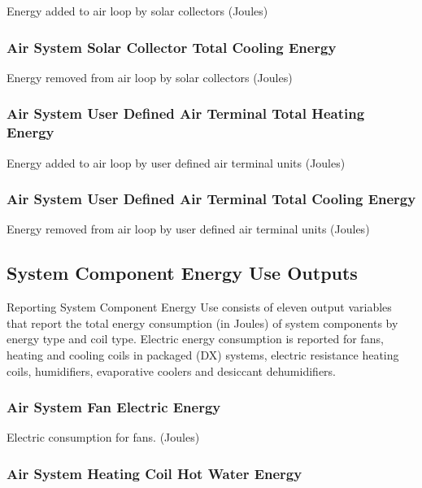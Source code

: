 Energy added to air loop by solar collectors (Joules)

\subsubsection{Air System Solar Collector Total Cooling Energy}\label{air-system-solar-collector-total-cooling-energy}

Energy removed from air loop by solar collectors (Joules)

\subsubsection{Air System User Defined Air Terminal Total Heating Energy}\label{air-system-user-defined-air-terminal-total-heating-energy}

Energy added to air loop by user defined air terminal units (Joules)

\subsubsection{Air System User Defined Air Terminal Total Cooling Energy}\label{air-system-user-defined-air-terminal-total-cooling-energy}

Energy removed from air loop by user defined air terminal units (Joules)

\subsection{System Component Energy Use Outputs}\label{system-component-energy-use-outputs}

Reporting System Component Energy Use consists of eleven output variables that report the total energy consumption (in Joules) of system components by energy type and coil type. Electric energy consumption is reported for fans, heating and cooling coils in packaged (DX) systems, electric resistance heating coils, humidifiers, evaporative coolers and desiccant dehumidifiers.

\subsubsection{Air System Fan Electric Energy}\label{air-system-fan-electric-energy}

Electric consumption for fans. (Joules)

\subsubsection{Air System Heating Coil Hot Water Energy}\label{air-system-heating-coil-hot-water-energy}

